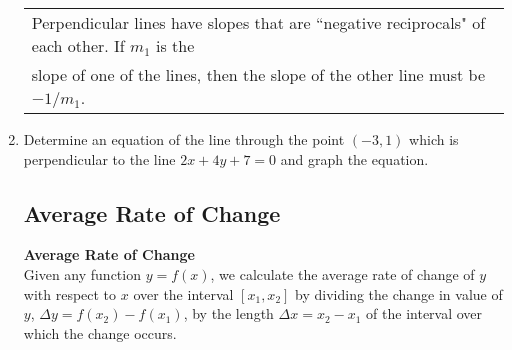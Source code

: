 \begin{enumerate}
\clearpage

\hspace{-.3in}\begin{tabular}{| l |  }
\hline Perpendicular lines have slopes that are ``negative reciprocals" of each other. If $m_1$ is the \\ slope of one of the lines, then the slope of the other line must be $-1/m_1$. \\ \hline
\end{tabular} 

\item Determine an equation of the line through the point $(-3, 1)$ which is perpendicular to the line $2x+4y+7=0$ and graph the equation.


        \vfill

\subsection{Average Rate of Change}
\textbf{Average Rate of Change}\\
Given any function $y=f(x)$, we calculate the average rate of change of $y$ with respect to $x$ over the interval  $[x_1,x_2]$ by dividing the change in value of $y$, $\Delta y=f(x_2)-f(x_1)$, by the length  $\Delta x=x_2-x_1$ of the interval over which the change occurs.\\



\end{enumerate}
